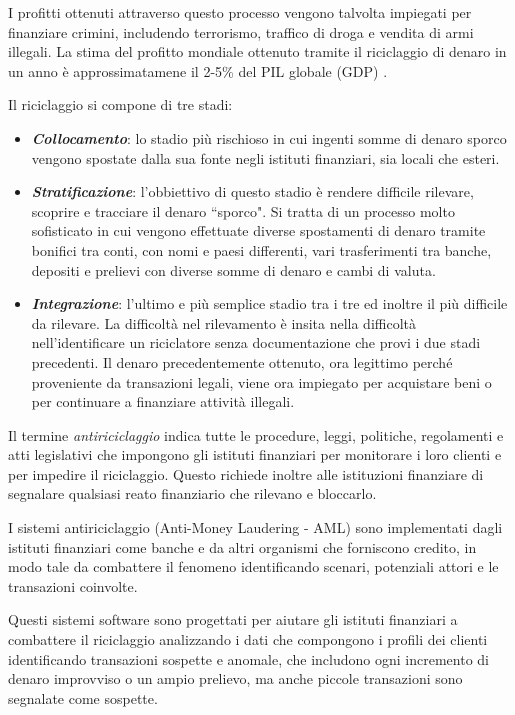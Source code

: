 I profitti ottenuti attraverso questo processo vengono talvolta impiegati per finanziare crimini, includendo terrorismo, traffico di droga e vendita di armi illegali. 
La stima del profitto mondiale ottenuto tramite il riciclaggio di denaro in un anno è approssimatamene il 2-5\% del PIL globale (GDP) . %

Il riciclaggio si compone di tre stadi:

\begin{itemize}

\item \textbf{\textit{Collocamento}}: lo stadio più rischioso in cui ingenti somme di denaro sporco vengono spostate dalla sua fonte negli istituti finanziari, sia locali che esteri. 

\item \textbf{\textit{Stratificazione}}: l’obbiettivo di questo stadio è rendere difficile rilevare, scoprire e tracciare il denaro ``sporco". Si tratta di un processo molto sofisticato in cui vengono effettuate diverse spostamenti di denaro tramite bonifici tra conti, con nomi e paesi differenti, vari trasferimenti tra banche, depositi e prelievi con diverse somme di denaro e cambi di valuta. 

\item \textit{\textbf{Integrazione}}: l’ultimo e più semplice stadio tra i tre ed inoltre il più difficile da rilevare.
La difficoltà nel rilevamento è insita nella difficoltà nell'identificare un riciclatore senza documentazione che provi i due stadi precedenti.
Il denaro precedentemente ottenuto, ora legittimo perché proveniente da transazioni legali, viene ora impiegato per acquistare beni o per continuare a finanziare attività illegali.
\end{itemize}

Il termine \textit{antiriciclaggio} indica tutte le procedure, leggi, politiche, regolamenti e atti legislativi che impongono gli istituti finanziari per monitorare i loro clienti e per impedire il riciclaggio. Questo richiede inoltre alle istituzioni finanziare di segnalare qualsiasi reato finanziario che rilevano e bloccarlo. 


I sistemi antiriciclaggio (Anti-Money Laudering - AML) sono implementati dagli istituti finanziari come banche e da altri organismi che forniscono credito, in modo tale da combattere il fenomeno identificando scenari, potenziali attori e le transazioni coinvolte.


Questi sistemi software sono progettati per aiutare gli istituti finanziari a combattere il riciclaggio analizzando i dati che compongono i profili dei clienti identificando transazioni sospette e anomale, che includono ogni incremento di denaro improvviso o un ampio prelievo, ma anche piccole transazioni sono segnalate come sospette.

